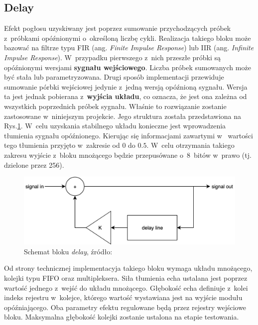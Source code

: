 
\subsection{Delay}

Efekt pogłosu uzyskiwany jest poprzez sumowanie przychodzących próbek z~próbkami opóźnionymi o~określoną liczbę cykli. Realizacja takiego bloku może bazować na filtrze typu FIR (ang. \textit{Finite Impulse Response}) lub IIR (ang. \textit{Infinite Impulse Response}). W~przypadku pierwszego z~nich przeszłe próbki są opóźnionymi wersjami \textbf{sygnału wejściowego}. Liczba próbek sumowanych może być stała lub parametryzowana. Drugi sposób implementacji przewiduje sumowanie pórbki wejściowej jedynie z~jedną wersją opóźnioną sygnału. Wersja ta jest jednak pobierana z~\textbf{wyjścia układu}, co oznacza, że jest ona zależna od wszystkich poprzednich próbek sygnału. Właśnie to rozwiązanie zostanie zastosowane w~niniejszym projekcie. Jego struktura została przedstawiona na Rys.\ref{effects-delay}. W~celu uzyskania stabilnego układu konieczne jest wprowadzenia tłumienia sygnału opóźnionego. Kierując się informacjami zawartymi w~\cite{fpga_pedal} wartości tego tłumienia przyjęto w~zakresie od $0$ do $0.5$. W~celu otrzymania takiego zakresu wyjście z~bloku mnożącego będzie przepusówane o~8~bitów w~prawo (tj. dzielone przez 256).

\vspace{0.5cm}
\begin{figure}[ht]
    \centering
    \includegraphics[scale=0.4]{img/delay.jpg}
    \captionsetup{format=plain,justification=centering}
    \caption{Schemat bloku \textit{delay}, źródło: \cite{fpga_pedal}}
    \label{effects-delay}
\end{figure}
\vspace{0.5cm}

Od strony technicznej implementacyja takiego bloku wymaga układu mnożącego, kolejki typu FIFO oraz multipleksera. Siła tłumienia echa ustalana jest poprzez wartość jednego z~wejść do układu mnożącego. Głębokość echa definiuje z~kolei indeks rejestru w~kolejce, którego wartość wystawiana jest na wyjście modułu opóźniającego. Oba parametry efektu regulowane będą przez rejestry wejściowe bloku. Maksymalna głębokość kolejki zostanie ustalona na etapie testowania.

